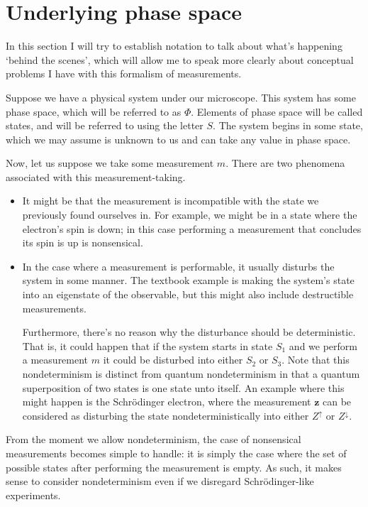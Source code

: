 \documentclass{article}
\theoremstyle{definition}
\begin{document}
\section{Underlying phase space}

In this section I will try to establish notation to talk about what's happening `behind the scenes', which will allow me to speak more clearly about conceptual problems I have with this formalism of measurements.

Suppose we have a physical system under our microscope. This system has some phase space, which will be referred to as $\Phi$. Elements of phase space will be called states, and will be referred to using the letter $S$. The system begins in some state, which we may assume is unknown to us and can take any value in phase space.

Now, let us suppose we take some measurement $m$. There are two phenomena associated with this measurement-taking.

\begin{itemize}
\item It might be that the measurement is incompatible with the state we previously found ourselves in. For example, we might be in a state where the electron's spin is down; in this case performing a measurement that concludes its spin is up is nonsensical.

\item In the case where a measurement is performable, it usually disturbs the system in some manner. The textbook example is making the system's state into an eigenstate of the observable, but this might also include destructible measurements.

Furthermore, there's no reason why the disturbance should be deterministic. That is, it could happen that if the system starts in state $S_1$ and we perform a measurement $m$ it could be disturbed into either $S_2$ or $S_3$. Note that this nondeterminism is distinct from quantum nondeterminism in that a quantum superposition of two states is one state unto itself. An example where this might happen is the Schrödinger electron, where the measurement $\mathbf{z}$ can be considered as disturbing the state nondeterministically into either $Z^\uparrow$ or $Z^\downarrow$.
\end{itemize}

From the moment we allow nondeterminism, the case of nonsensical measurements becomes simple to handle: it is simply the case where the set of possible states after performing the measurement is empty. As such, it makes sense to consider nondeterminism even if we disregard Schrödinger-like experiments.
\end{document}
